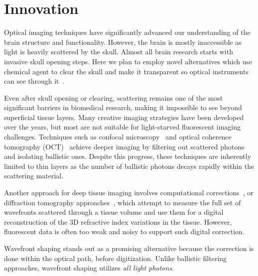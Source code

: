 \section{Innovation}

Optical imaging techniques have significantly advanced our understanding of the brain structure and functionality. However, the brain is mostly inaccessible as light is heavily scattered by the skull. Almost all brain research starts with invasive skull opening steps. Here we plan to employ novel alternatives which use chemical agent to clear the skull and make it transparent so optical instruments can see through it~\cite{Li2022TIS}. 

 Even after skull opening or clearing, scattering remains one of the most significant barriers in biomedical research, making it impossible to see beyond superficial tissue layers. Many creative imaging strategies have been developed over the years, but most are not suitable for light-starved fluorescent imaging challenges. Techniques such as confocal microscopy~\cite{ConfocalMicroscopyOverView2020} and optical coherence tomography (OCT)~\cite{OCTOverview2016} achieve deeper imaging by filtering out scattered photons and isolating ballistic ones. Despite this progress, these techniques are inherently limited to thin layers as the number of ballistic photons decays rapidly within the scattering material.

Another approach for deep tissue imaging involves computational corrections~\cite{Metzler23NeuWS,YeminyKatz2021,haim2023imageguidedcomputationalholographicwavefront,Balondrade_2024,Kang2017,Najar2024, Zhu22, Baek_2023,Jeong2018,Gil2024,Yonghyeon2022}, or diffraction tomography approaches~\cite{Kim2013,Horstmeyer:16,Chowdhury:17,Chowdhury:19,Chen:20,Zhou:20,ChoiLyers2023,liu2022recoverycontinuous3drefractive,Xue:22,he2024fluorescencediffractiontomographyusing,Kamilov:15,Sun:18,PMID:17694065,Choi2011,Choi2015,Badoneaay7170,Kwon2023,zhang2024deepimaginginsidescattering,Choi2023AngWavelength}, which attempt to measure the full set of wavefronts scattered through a tissue volume and use them for a digital reconstruction of the 3D refractive index variations in the tissue. However, fluorescent data is often too weak and noisy to support such digital correction.

Wavefront shaping stands out as a promising alternative because the correction is done within the optical path, before digitization. Unlike ballistic filtering approaches, wavefront shaping utilizes {\em all light photons}.
 
